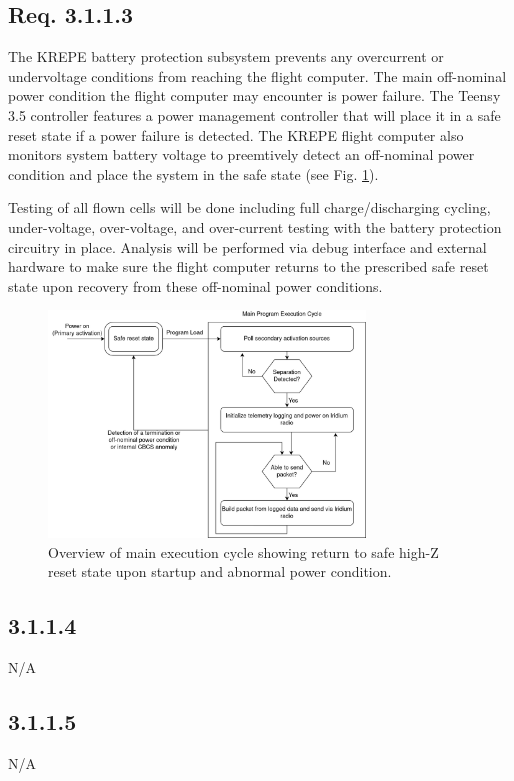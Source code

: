\documentclass{article}
\begin{document}
\subsection{Req. 3.1.1.3}
The KREPE battery protection subsystem prevents any overcurrent or undervoltage conditions from reaching the flight computer. The main off-nominal power condition the flight computer may encounter is power failure. The Teensy 3.5 controller features a power management controller that will place it in a safe reset state if a power failure is detected. The KREPE flight computer also  monitors system battery voltage to preemtively detect an off-nominal power condition and place the system in the safe state (see Fig. \ref{fig:exec-lifecycle}).

Testing of all flown cells will be done including full charge/discharging cycling, under-voltage, over-voltage, and over-current testing with the battery protection circuitry in place. Analysis will be performed via debug interface and external hardware to make sure the flight computer returns to the prescribed safe reset state upon recovery from these off-nominal power conditions.

\begin{figure}
  \centering
  \includegraphics[width=0.75\textwidth]{images/software-overview.png}
  \caption{Overview of main execution cycle showing return to safe high-Z reset state upon startup and abnormal power condition.}
  \label{fig:exec-lifecycle}
\end{figure}

\subsection{3.1.1.4}
N/A

\subsection{3.1.1.5}
N/A
\end{document}
